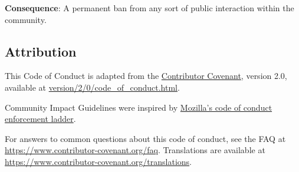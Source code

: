\textbf{Consequence}: A permanent ban from any sort of public
interaction within the community.

\subsection{Attribution}\label{attribution}

This Code of Conduct is adapted from the \href{https://www.contributor-covenant.org}{Contributor Covenant},
version 2.0, available at \href{https://www.contributor-covenant.org/version/2/0/code\_of\_conduct.html}{version/2/0/code\_of\_conduct.html}.

Community Impact Guidelines were inspired by
\href{https://github.com/mozilla/diversity}{Mozilla's code of conduct
enforcement ladder}.

For answers to common questions about this code of conduct, see the FAQ
at \href{\url{https://www.contributor-covenant.org/faq}}{https://www.contributor-covenant.org/faq}.
Translations are available
at \href{https://www.contributor-covenant.org/translations}{https://www.contributor-covenant.org/translations}.
